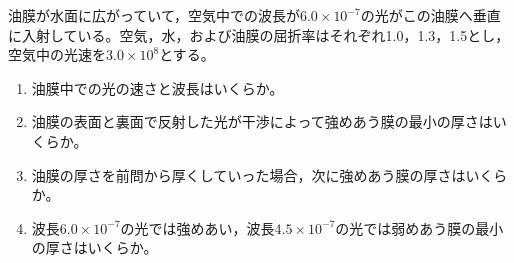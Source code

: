 \hakosyokika
\item 油膜が水面に広がっていて，空気中での波長が$6.0\times 10^{-7}$の光がこの油膜へ垂直に入射している。空気，水，および油膜の屈折率はそれぞれ1.0，1.3，1.5とし，空気中の光速を$3.0\times 10^8$とする。
    \begin{enumerate}
            \item 油膜中での光の速さと波長はいくらか。
            \item 油膜の表面と裏面で反射した光が干渉によって強めあう膜の最小の厚さはいくらか。
            \item 油膜の厚さを前問から厚くしていった場合，次に強めあう膜の厚さはいくらか。
            \item 波長$6.0\times 10^{-7}$の光では強めあい，波長$4.5\times 10^{-7}$の光では弱めあう膜の最小の厚さはいくらか。
    \end{enumerate}
